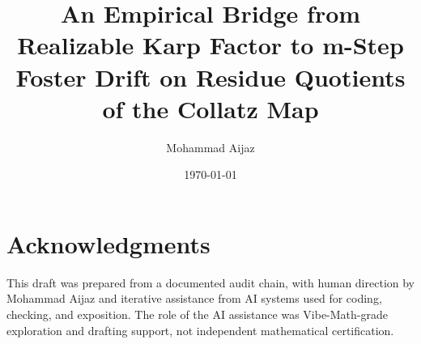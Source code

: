 \documentclass[11pt]{amsart}
\title{An Empirical Bridge from Realizable Karp Factor to m-Step Foster Drift on Residue Quotients of the Collatz Map}
\author{Mohammad Aijaz}
\date{\today}
\begin{document}
\begin{abstract}

\end{abstract}

\maketitle











\section*{Acknowledgments}
This draft was prepared from a documented audit chain, with human direction by
Mohammad Aijaz and iterative assistance from AI systems used for coding,
checking, and exposition. The role of the AI assistance was Vibe-Math-grade
exploration and drafting support, not independent mathematical certification.

\nocite{mori2024operator,hercher2022cycles,paparella2024matricial}
\printbibliography
\end{document}
